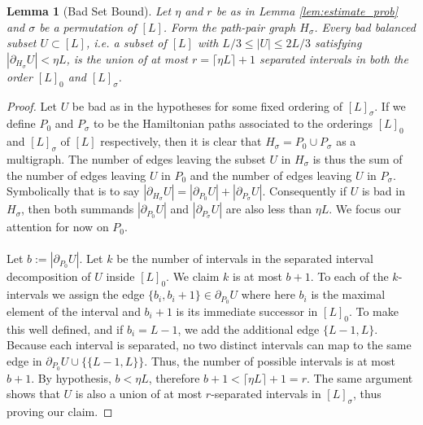 \documentclass[11pt,a4paper]{amsart}
\newtheorem{lemma}[theorem]{Lemma}
\theoremstyle{definition}
\theoremstyle{remark}
\begin{document}
\begin{lemma}[Bad Set Bound]\label{lem:badbound}
Let $\eta$ and $r$ be as in Lemma \ref{lem:estimate_prob} and $\sigma$ be a permutation of $[L]$.  Form the path-pair graph $H_{\sigma}$.  Every bad balanced subset $U \subset [L]$, i.e. a subset of $[L]$ with $L/3 \leq |U| \leq 2L/3$ satisfying $|\partial_{H_{\sigma}} U| < \eta L$, is the union of at most $r = \lceil \eta L \rceil + 1$ separated intervals in both the order $[L]_{0}$ and $[L]_{\sigma}$.  
\end{lemma}

\begin{proof}
Let $U$ be bad as in the hypotheses for some fixed ordering of $[L]_{\sigma}$.  If we define $P_{0}$ and $P_{\sigma}$ to be the Hamiltonian paths associated to the orderings $[L]_{0}$ and $[L]_{\sigma}$ of $[L]$ respectively, then it is clear that $H_{\sigma} = P_{0}\cup P_{\sigma}$ as a multigraph.  The number of edges leaving the subset $U$ in $H_{\sigma}$ is thus the sum of the number of edges leaving $U$ in $P_{0}$ and the number of edges leaving $U$ in $P_{\sigma}$.  Symbolically that is to say $|\partial_{H_{\sigma}} U| = |\partial_{P_{0}}U| + |\partial_{P_{\sigma}}U|$.  Consequently if $U$ is bad in $H_{\sigma}$, then both summands $|\partial_{P_{0}}U|$ and $|\partial_{P_{\sigma}}U|$ are also less than $\eta L$.  We focus our attention for now on $P_{0}$.  \\
\\
Let $b := |\partial_{P_{0}}U|$.  Let $k$ be the number of intervals in the separated interval decomposition of $U$ inside $[L]_{0}$.  We claim $k$ is at most $b+1$.  To each of the $k$-intervals we assign the edge $\{b_{i},b_{i}+1\} \in \partial_{P_{0}} U$ where here $b_{i}$ is the maximal element of the interval and $b_{i}+1$ is its immediate successor in $[L]_{0}$.  To make this well defined, and if $b_{i} = L-1$, we add the additional edge $\{L-1,L\}$.  Because each interval is separated, no two distinct intervals can map to the same edge in $\partial_{P_{0}} U \cup \{\{L-1,L\}\}$.  Thus, the number of possible intervals is at most $b+1$.  By hypothesis, $b < \eta L$, therefore $b+1 < \lceil \eta L \rceil + 1 = r$.  The same argument shows that $U$ is also a union of at most $r$-separated intervals in $[L]_{\sigma}$, thus proving our claim.
\end{proof}
\end{document}
